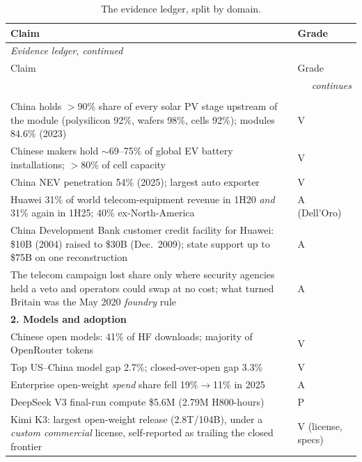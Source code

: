 \begin{small}
\begin{longtable}{p{100mm}p{36mm}}
  \caption{The evidence ledger, split by domain.}
  \label{tab:ledger} \\
  \toprule
  Claim & Grade \\
  \midrule
  \endfirsthead
  \multicolumn{2}{l}{\footnotesize\emph{Evidence ledger, continued}} \\
  \toprule
  Claim & Grade \\
  \midrule
  \endhead
  \midrule
  \multicolumn{2}{r}{\footnotesize\emph{continues}} \\
  \endfoot
  \bottomrule
  \endlastfoot
  \multicolumn{2}{l}{\textbf{1. Industrial precedents}} \\
  \midrule
  China holds $>$90\% share of every solar PV stage upstream of the module (polysilicon 92\%, wafers 98\%, cells 92\%); modules 84.6\% (2023) & V \\
  Chinese makers hold $\sim$69--75\% of global EV battery installations; $>$80\% of cell capacity & V \\
  China NEV penetration 54\% (2025); largest auto exporter & V \\
  Huawei 31\% of world telecom-equipment revenue in 1H20 \emph{and} 31\% again in 1H25; 40\% ex-North-America & A (Dell'Oro) \\
  China Development Bank customer credit facility for Huawei: \$10B (2004) raised to \$30B (Dec.\ 2009); state support up to \$75B on one reconstruction & A \\
  The telecom campaign lost share only where security agencies held a veto and operators could swap at no cost; what turned Britain was the May 2020 \emph{foundry} rule & A \\
  \midrule
  \multicolumn{2}{l}{\textbf{2. Models and adoption}} \\
  \midrule
  Chinese open models: 41\% of HF downloads; majority of OpenRouter tokens & V \\
  Top US--China model gap 2.7\%; closed-over-open gap 3.3\% & V \\
  Enterprise open-weight \emph{spend} share fell 19\%$\rightarrow$11\% in 2025 & A \\
  DeepSeek V3 final-run compute \$5.6M (2.79M H800-hours) & P \\
  Kimi K3: largest open-weight release (2.8T/104B), under a \emph{custom commercial} license, self-reported as trailing the closed frontier & V (license, specs) \\

\end{longtable}
\end{small}
